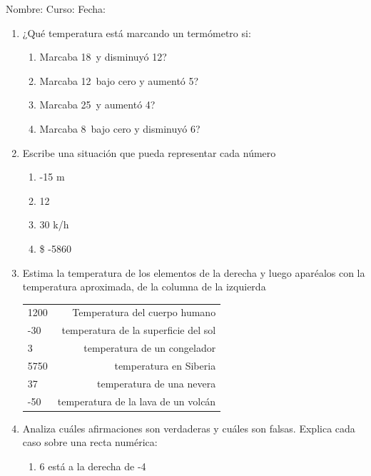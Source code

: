 \documentclass[fleqn]{article}
\newcommand{\LineaNombre}{%
\par
\vspace{\baselineskip}
Nombre:\hrulefill \; Curso: \underline{\hspace*{48pt}} \; Fecha: \underline{\hspace*{2.5cm}} \relax
\par}
\begin{document}
\LineaNombre
\begin{enumerate}
\item ¿Qué temperatura está marcando un termómetro si:
  \begin{enumerate}
  \item Marcaba 18\textcelsius\, y disminuyó 12\textcelsius ? \dotfill
  \item Marcaba 12\textcelsius\, bajo cero y aumentó 5\textcelsius? \dotfill
  \item Marcaba 25\textcelsius\, y aumentó 4\textcelsius? \dotfill
  \item Marcaba 8\textcelsius \, bajo cero y disminuyó 6\textcelsius? \dotfill
    \end{enumerate}
\item Escribe una situación que pueda representar cada número
\begin{enumerate}
  \item -15 m \dotfill
  \item 12\textcelsius \, \dotfill
  \item 30 k/h \dotfill
  \item \$ -5860 \dotfill
  \end{enumerate}
\item Estima la temperatura de los elementos de la derecha y luego aparéalos con la temperatura aproximada, de la columna de la izquierda\\
\begin{center}
\begin{tabular}{p{3cm}r}
		1200\textcelsius  & Temperatura del cuerpo humano \\
		-30\textcelsius  & temperatura de la superficie del sol \\
		3\textcelsius  & temperatura de un congelador \\
		5750\textcelsius & temperatura en Siberia\\
		37\textcelsius & temperatura de una nevera\\
		-50\textcelsius & temperatura de la lava de un volcán\\
	\end{tabular}
\end{center}
\item Analiza cuáles afirmaciones son verdaderas y cuáles son falsas. Explica cada caso sobre una recta numérica:
\begin{enumerate}
  \item 6 está a la derecha de -4 \noanswer

\end{enumerate}
\end{enumerate}
\end{document}
